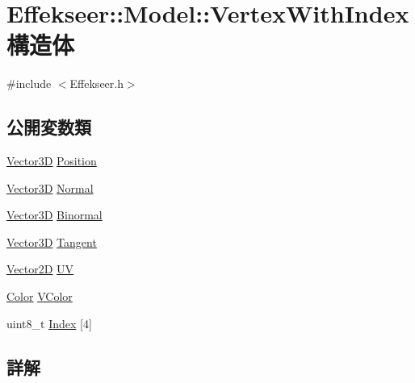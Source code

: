 \hypertarget{struct_effekseer_1_1_model_1_1_vertex_with_index}{}\section{Effekseer\+:\+:Model\+:\+:Vertex\+With\+Index 構造体}
\label{struct_effekseer_1_1_model_1_1_vertex_with_index}


{\ttfamily \#include $<$Effekseer.\+h$>$}

\subsection*{公開変数類}
\begin{DoxyCompactItemize}
\item 
\mbox{\hyperlink{struct_effekseer_1_1_vector3_d}{Vector3D}} \mbox{\hyperlink{struct_effekseer_1_1_model_1_1_vertex_with_index_a22384cf486e5836ecaa7e44223d48030}{Position}}
\item 
\mbox{\hyperlink{struct_effekseer_1_1_vector3_d}{Vector3D}} \mbox{\hyperlink{struct_effekseer_1_1_model_1_1_vertex_with_index_a62d6f178cabfca2b4804db18808d1f42}{Normal}}
\item 
\mbox{\hyperlink{struct_effekseer_1_1_vector3_d}{Vector3D}} \mbox{\hyperlink{struct_effekseer_1_1_model_1_1_vertex_with_index_ab5eaf1806d47de81ab10b5c0dc657e33}{Binormal}}
\item 
\mbox{\hyperlink{struct_effekseer_1_1_vector3_d}{Vector3D}} \mbox{\hyperlink{struct_effekseer_1_1_model_1_1_vertex_with_index_a851f79cd3d0e50a5e8dd6e0cec83d7bf}{Tangent}}
\item 
\mbox{\hyperlink{struct_effekseer_1_1_vector2_d}{Vector2D}} \mbox{\hyperlink{struct_effekseer_1_1_model_1_1_vertex_with_index_a38ec916ab361fc5ce55283cf6e89c941}{UV}}
\item 
\mbox{\hyperlink{struct_effekseer_1_1_color}{Color}} \mbox{\hyperlink{struct_effekseer_1_1_model_1_1_vertex_with_index_aff987e0ba3b15c7682072f054860d2bc}{V\+Color}}
\item 
uint8\+\_\+t \mbox{\hyperlink{struct_effekseer_1_1_model_1_1_vertex_with_index_aa9ba7ef223b374fd22c07b0be4a89ee2}{Index}} \mbox{[}4\mbox{]}
\end{DoxyCompactItemize}


\subsection{詳解}


